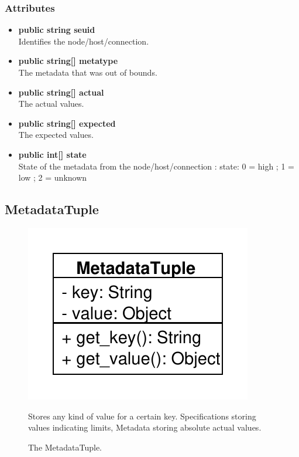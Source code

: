 \subsubsection{Attributes}
\begin{itemize}
	\item \textbf{public string seuid}\\
	Identifies the node/host/connection.
	\item \textbf{public string[] metatype}\\
	The metadata that was out of bounds.
	\item \textbf{public string[] actual}\\
	The actual values.
	\item \textbf{public string[] expected}\\
	The expected values.
	\item \textbf{public int[] state}\\
	State of the metadata from the node/host/connection : state: { 0 = high ; 1 = low ; 2 = unknown}
\end{itemize}


\subsection{MetadataTuple}
\begin{figure}[htbp]
	\begin{minipage}[t]{7cm}
		\vspace{0pt}
		\centering
		\includegraphics[scale=0.6]{./diagram_pictures/MetadataTuple.pdf}
		\caption{The MetadataTuple.}
	\end{minipage}
	\hfill
	\begin{minipage}[t]{8cm}
		\vspace{10pt}
		Stores any kind of value for a certain key. Specifications storing values indicating limits, Metadata storing absolute actual values.
	\end{minipage}
\end{figure}

